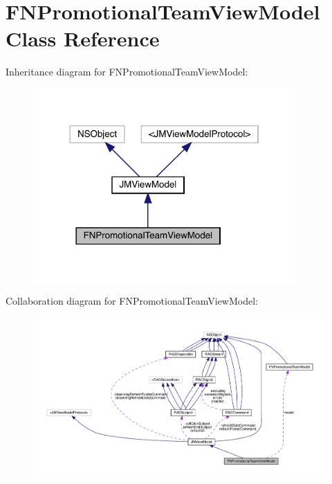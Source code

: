 \hypertarget{interface_f_n_promotional_team_view_model}{}\section{F\+N\+Promotional\+Team\+View\+Model Class Reference}
\label{interface_f_n_promotional_team_view_model}


Inheritance diagram for F\+N\+Promotional\+Team\+View\+Model\+:\nopagebreak
\begin{figure}[H]
\begin{center}
\leavevmode
\includegraphics[width=284pt]{interface_f_n_promotional_team_view_model__inherit__graph}
\end{center}
\end{figure}


Collaboration diagram for F\+N\+Promotional\+Team\+View\+Model\+:\nopagebreak
\begin{figure}[H]
\begin{center}
\leavevmode
\includegraphics[width=350pt]{interface_f_n_promotional_team_view_model__coll__graph}
\end{center}
\end{figure}

